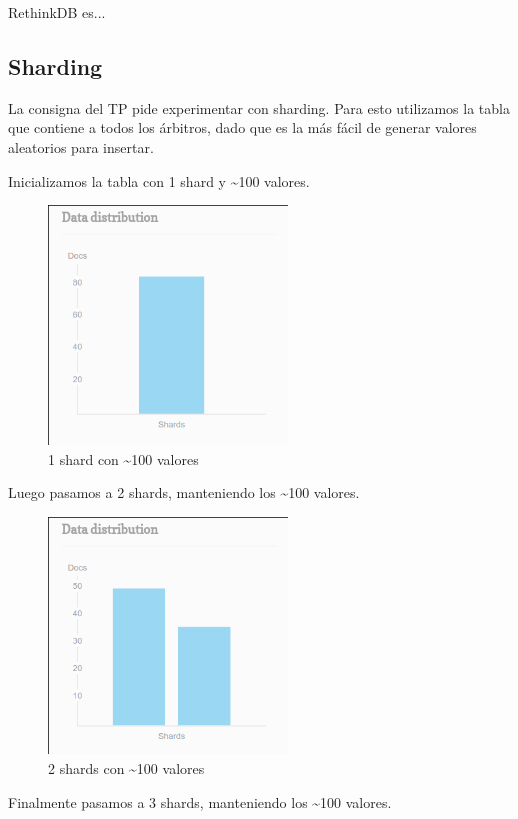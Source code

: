 
RethinkDB es...


\subsection{Sharding}

La consigna del TP pide experimentar con sharding. Para esto utilizamos la tabla que contiene a todos los árbitros, dado que es la más fácil de generar valores aleatorios para insertar.

Inicializamos la tabla con 1 shard y \textasciitilde 100 valores.

\begin{figure}[H]
 \centering
 \includegraphics[width=2.5in]{sharding/img/1shard.png}
 \caption{1 shard con \textasciitilde 100 valores}
 \label{fig:1shard}
\end{figure}

Luego pasamos a 2 shards, manteniendo los \textasciitilde 100 valores.

\begin{figure}[H]
 \centering
 \includegraphics[width=2.5in]{sharding/img/2shard.png}
 \caption{2 shards con \textasciitilde 100 valores}
 \label{fig:2shard}
\end{figure}

Finalmente pasamos a 3 shards, manteniendo los \textasciitilde 100 valores.

